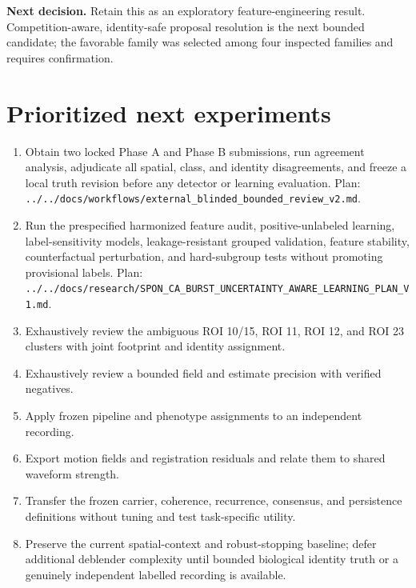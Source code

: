 \textbf{Next decision.} Retain this as an exploratory feature-engineering result. Competition-aware, identity-safe proposal resolution is the next bounded candidate; the favorable family was selected among four inspected families and requires confirmation.

\section{Prioritized next experiments}

\begin{enumerate}

\item Obtain two locked Phase A and Phase B submissions, run agreement analysis, adjudicate all spatial, class, and identity disagreements, and freeze a local truth revision before any detector or learning evaluation. Plan: \texttt{../../docs/workflows/external\_blinded\_bounded\_review\_v2.md}.

\item Run the prespecified harmonized feature audit, positive-unlabeled learning, label-sensitivity models, leakage-resistant grouped validation, feature stability, counterfactual perturbation, and hard-subgroup tests without promoting provisional labels. Plan: \texttt{../../docs/research/SPON\_CA\_BURST\_UNCERTAINTY\_AWARE\_LEARNING\_PLAN\_V1.md}.

\item Exhaustively review the ambiguous ROI 10/15, ROI 11, ROI 12, and ROI 23 clusters with joint footprint and identity assignment.

\item Exhaustively review a bounded field and estimate precision with verified negatives.

\item Apply frozen pipeline and phenotype assignments to an independent recording.

\item Export motion fields and registration residuals and relate them to shared waveform strength.

\item Transfer the frozen carrier, coherence, recurrence, consensus, and persistence definitions without tuning and test task-specific utility.

\item Preserve the current spatial-context and robust-stopping baseline; defer additional deblender complexity until bounded biological identity truth or a genuinely independent labelled recording is available.

\end{enumerate}

